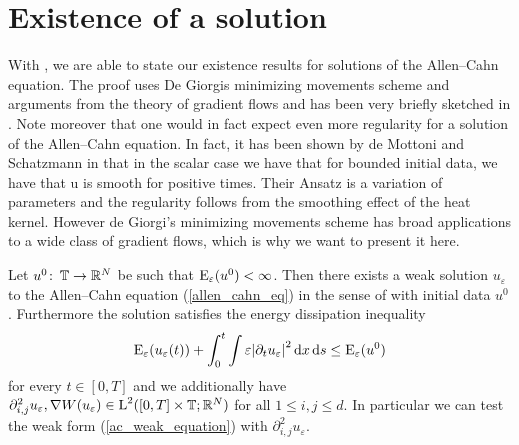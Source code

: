 \section{Existence of a solution}

With , we are able to state our existence results for 
solutions of the Allen--Cahn equation. The proof uses De Giorgis minimizing 
movements scheme and arguments from the theory of gradient flows and has been 
very 
briefly sketched in 
\cite{convergence_of_allen_cahn_equation_to_multiphase_mean_curvature_flow}. 
Note moreover that one would in fact expect even more regularity for a solution 
of the Allen--Cahn equation. In fact, it has been shown by de Mottoni and 
Schatzmann in 
\cite{de_mottoni_schatzmann_geometrical_evolution_of_developed_interfaces} that 
in the scalar case we have that for bounded initial data, we have that u is 
smooth for positive times. Their Ansatz is a variation of parameters and the 
regularity follows from the smoothing effect of the heat kernel. However de 
Giorgi's minimizing movements scheme has broad applications to a wide class of 
gradient flows, which is why we want to present it here.

\begin{theorem}
	\label{existence_of_ac_solution}
	Let $ u^{ 0 } \colon \operatorname{\mathbb{T}} \to \mathbb{ R }^{ N } $ be such that 
	$ \operatorname{E}_{ \varepsilon } ( u^{ 0 } ) < \infty $.
	Then there exists a weak solution $ u_{ \varepsilon} $ to the Allen--Cahn 
	equation (\ref{allen_cahn_eq}) in the sense of  with 
	initial data $ u^{ 0 } $.
	Furthermore the solution satisfies the energy dissipation inequality
	\begin{equation}
		\label{energy_dissipation_sharp}
		\operatorname{E}_{ \varepsilon } ( u_{ \varepsilon } ( t ) )
		+
		\int_{ 0 }^{ t }
		\int
		\varepsilon \abs{ \partial_{ t } u_{ \varepsilon } }^{ 2 }
		\dd{ x }
		\dd{ s }
		\leq
		\operatorname{E}_{ \varepsilon } ( u^{ 0 } )
	\end{equation}
	for every $ t \in [ 0 , T ] $ and we additionally have
	$
	\partial_{ i , j }^{ 2 } u_{ \varepsilon }, \nabla W ( u_{ \varepsilon } ) \in \operatorname{L}^{ 2 } ( [0, T] \times \operatorname{\mathbb{T}} ; \mathbb{ R }^{ N } ) 
	$
	for all $ 1 \leq i, j \leq d $. In particular we can test the weak form (\ref{ac_weak_equation}) with $ \partial_{ i , j }^{ 2 } u_{ \varepsilon } $.
\end{theorem}

